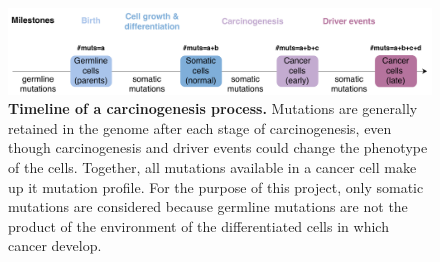 \begin{figure}[h!]
    \centering
    \includegraphics[scale=0.78]{graphics/drivers_demo.pdf}
    \caption{\textbf{Timeline of a carcinogenesis process.} Mutations are generally retained in the genome after each stage of carcinogenesis, even though carcinogenesis and driver events could change the phenotype of the cells. Together, all mutations available in a cancer cell make up it mutation profile. For the purpose of this project, only somatic mutations are considered because germline mutations are not the product of the environment of the differentiated cells in which cancer develop.}
    \label{fig:drivers_demo}
\end{figure}
